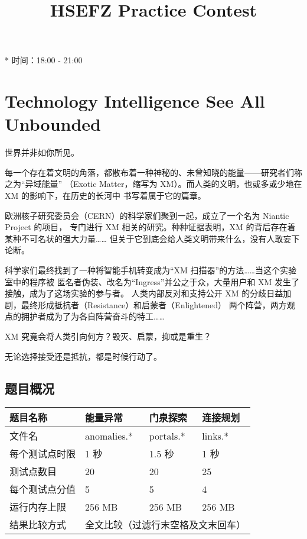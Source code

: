 \documentclass[UTF8, 11pt, a4paper]{article}
\begin{document}
\title{HSEFZ Practice Contest}
\maketitle

* 时间：18:00 - 21:00
\newpage

\section*{Technology Intelligence See All Unbounded}

世界并非如你所见。

每一个存在着文明的角落，都散布着一种神秘的、未曾知晓的能量——研究者们称之为“异域能量”%
（Exotic Matter，缩写为 XM）。而人类的文明，也或多或少地在 XM 的影响下，在历史的长河中%
书写着属于它的篇章。

欧洲核子研究委员会（CERN）的科学家们聚到一起，成立了一个名为 Niantic Project 的项目，%
专门进行 XM 相关的研究。种种证据表明，XM 的背后存在着某种不可名状的强大力量……%
但关于它到底会给人类文明带来什么，没有人敢妄下论断。

科学家们最终找到了一种将智能手机转变成为“XM 扫描器”的方法……当这个实验室中的程序被%
匿名者伪装、改名为“Ingress”并公之于众，大量用户和 XM 发生了接触，成为了这场实验的参与者。%
人类内部反对和支持公开 XM 的分歧日益加剧，最终形成抵抗者（Resistance）和启蒙者（Enlightened）%
两个阵营，两方观点的拥护者成为了为各自阵营奋斗的特工……

XM 究竟会将人类引向何方？毁灭、启蒙，抑或是重生？

无论选择接受还是抵抗，都是时候行动了。
\newline\newline

\subsection*{题目概况}
\begin{tabularx}{\textwidth}{|X|X|X|X|}
\hline
题目名称 & 能量异常 & 门泉探索 & 连接规划 \\ \hline
文件名 & anomalies.* & portals.* & links.* \\ \hline
每个测试点时限 & 1 秒 & 1.5 秒 & 1 秒 \\ \hline
测试点数目 & 20 & 20 & 25 \\ \hline
每个测试点分值 & 5 & 5 & 4 \\ \hline
运行内存上限 & 256 MB & 256 MB & 256 MB \\ \hline
结果比较方式 & \multicolumn{3}{c|}{全文比较（过滤行末空格及文末回车）} \\ \hline
\end{tabularx}
\end{document}
